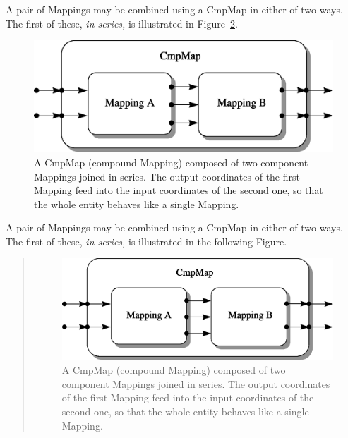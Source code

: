 \documentclass[twoside,11pt]{article}
\newenvironment{latexonly}{}{}
\begin{document}
\begin{latexonly}
   A pair of Mappings may be combined using a CmpMap in either of two
   ways. The first of these, {\em{in series,}} is illustrated in
   Figure~\ref{fig:seriescmpmap}.
   \begin{figure}
   \begin{center}
   \includegraphics[scale=0.5]{sun210_figures/series.eps}
   \caption{A CmpMap (compound Mapping) composed of two component
   Mappings joined in series. The output coordinates of the first Mapping
   feed into the input coordinates of the second one, so that the whole
   entity behaves like a single Mapping.}
   \label{fig:seriescmpmap}
   \end{center}
   \end{figure}
\end{latexonly}
\begin{htmlonly}
   A pair of Mappings may be combined using a CmpMap in either of two
   ways. The first of these, {\em{in series,}} is illustrated in the
   following Figure.
   \begin{quote}
   \begin{figure}
   \label{fig:seriescmpmap}
   \includegraphics[scale=1.0]{sun210_figures/series.eps}
   \caption{A CmpMap (compound Mapping) composed of two component
   Mappings joined in series. The output coordinates of the first Mapping
   feed into the input coordinates of the second one, so that the whole
   entity behaves like a single Mapping.}
   \end{figure}
   \end{quote}
\end{htmlonly}
\end{document}
